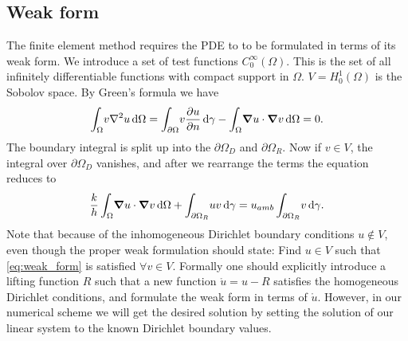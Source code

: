 \subsection{Weak form}
The finite element method requires the PDE to to be formulated in terms of its weak form. We introduce a set of test functions $C_0^\infty(\Omega)$. This is the set of all infinitely differentiable functions with compact support in $\Omega$. $V = H_0^1(\Omega)$ is the Sobolov space. By Green's formula we have
\begin{equation}
	\int_\Omega \! v\laplacian{u} \, \mathrm{d}\Omega = \int_{\partial\Omega} \! v\pdv{u}{n} \, \mathrm{d}\gamma -  \int_\Omega \! \grad{u}\cdot\grad{v} \, \mathrm{d}\Omega = 0
	\label{eq:green}.
\end{equation}
The boundary integral is split up into the $\partial\Omega_D$ and $\partial\Omega_R$. Now if $v \in V$, the integral over $\partial\Omega_D$ vanishes, and after we rearrange the terms the equation reduces to 
\begin{equation}
	\frac{k}{h}\int_\Omega \! \grad{u}\cdot\grad{v} \, \mathrm{d}\Omega + \int_{\partial\Omega_R} \! uv\, \mathrm{d}\gamma = u_{amb}\int_{\partial\Omega_R} \! v \, \mathrm{d}\gamma.
	\label{eq:weak_form}
\end{equation}
Note that because of the inhomogeneous Dirichlet boundary conditions $u \notin V$, even though the proper weak formulation should state: Find $u \in V$ such that \eqref{eq:weak_form} is satisfied $\forall v \in V$. Formally one should explicitly introduce a lifting function $R$ such that a new function $\mathring{u} = u - R$ satisfies the homogeneous Dirichlet conditions, and formulate the weak form in terms of $\mathring{u}$. However, in our numerical scheme we will get the desired solution by setting the solution of our linear system to the known Dirichlet boundary values.

